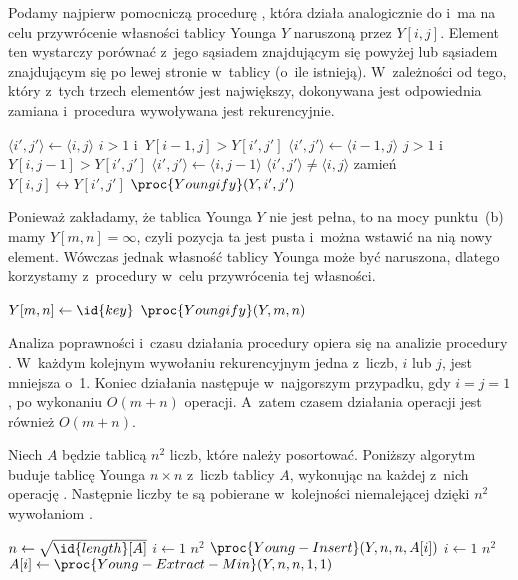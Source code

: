 \subproblem %
Podamy najpierw pomocniczą procedurę , która działa analogicznie do  i~ma na celu przywrócenie własności tablicy Younga $Y$ naruszoną przez $Y[i,j]$. Element ten wystarczy porównać z~jego sąsiadem znajdującym się powyżej lub sąsiadem znajdującym się po lewej stronie w~tablicy (o~ile istnieją). W~zależności od tego, który z~tych trzech elementów jest największy, dokonywana jest odpowiednia zamiana i~procedura wywoływana jest rekurencyjnie.
\begin{codebox}
\li	$\langle i',j'\rangle\gets\langle i,j\rangle$
\li	\If $i>1$ i~$Y[i-1,j]>Y[i',j']$
\li		\Then $\langle i',j'\rangle\gets\langle i-1,j\rangle$
		\End
\li	\If $j>1$ i~$Y[i,j-1]>Y[i',j']$
\li		\Then $\langle i',j'\rangle\gets\langle i,j-1\rangle$
		\End
\li	\If $\langle i',j'\rangle\ne\langle i,j\rangle$
\li		\Then
			zamień $Y[i,j]\leftrightarrow Y[i',j']$
\li			$\proc{Youngify}(Y,i',j')$
		\End
\end{codebox}

Ponieważ zakładamy, że tablica Younga $Y$ nie jest pełna, to na mocy punktu~(b) mamy $Y[m,n]=\infty$, czyli pozycja ta jest pusta i~można wstawić na nią nowy element. Wówczas jednak własność tablicy Younga może być naruszona, dlatego korzystamy z~procedury  w~celu przywrócenia tej własności.
\begin{codebox}
\li	$Y[m,n]\gets\id{key}$
\li	$\proc{Youngify}(Y,m,n)$
\end{codebox}

Analiza poprawności i~czasu działania procedury  opiera się na analizie procedury . W~każdym kolejnym wywołaniu rekurencyjnym jedna z~liczb, $i$ lub $j$, jest mniejsza o~1. Koniec działania następuje w~najgorszym przypadku, gdy $i=j=1$, po wykonaniu $O(m+n)$ operacji. A~zatem czasem działania operacji  jest również $O(m+n)$.

\subproblem %
Niech $A$ będzie tablicą $n^2$ liczb, które należy posortować. Poniższy algorytm buduje tablicę Younga $n\times n$ z~liczb tablicy $A$, wykonując na każdej z~nich operację . Następnie liczby te są pobierane w~kolejności niemalejącej dzięki $n^2$ wywołaniom .
\begin{codebox}
\li	$n\gets\sqrt{\id{length}[A]}$
\li	\For $i\gets1$ \To $n^2$
\li		\Do $\proc{Young-Insert}(Y,n,n,A[i])$
		\End
\li	\For $i\gets1$ \To $n^2$
\li		\Do $A[i]\gets\proc{Young-Extract-Min}(Y,n,n,1,1)$
		\End
\end{codebox}

